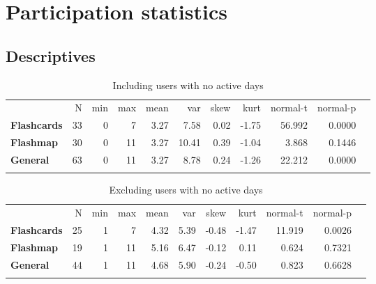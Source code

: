 \chapter{Participation statistics}
\label{app:dropouts}

\section{Descriptives}

\begin{longtable}[c]{@{}lrrrrrrrrrr@{}}
    \caption{Including users with no active days}
\endfirsthead
\toprule\addlinespace
& N & min & max & mean & var & skew & kurt & normal-t & normal-p
\\\addlinespace
\midrule
\textbf{Flashcards} & 33 & 0 & 7 & 3.27 & 7.58 & 0.02 & -1.75 & 56.992 &
0.0000
\\\addlinespace
\textbf{Flashmap} & 30 & 0 & 11 & 3.27 & 10.41 & 0.39 & -1.04 & 3.868 &
0.1446
\\\addlinespace
\textbf{General} & 63 & 0 & 11 & 3.27 & 8.78 & 0.24 & -1.26 & 22.212 &
0.0000
\\\addlinespace
\bottomrule
    \label{tab:dropouts_incl}
\end{longtable}

\begin{longtable}[c]{@{}lrrrrrrrrrr@{}}
    \caption{Excluding users with no active days}
\endfirsthead
\toprule\addlinespace
& N & min & max & mean & var & skew & kurt & normal-t & normal-p
\\\addlinespace
\midrule
\textbf{Flashcards} & 25 & 1 & 7 & 4.32 & 5.39 & -0.48 & -1.47 & 11.919
& 0.0026
\\\addlinespace
\textbf{Flashmap} & 19 & 1 & 11 & 5.16 & 6.47 & -0.12 & 0.11 & 0.624 &
0.7321
\\\addlinespace
\textbf{General} & 44 & 1 & 11 & 4.68 & 5.90 & -0.24 & -0.50 & 0.823 &
0.6628
\\\addlinespace
\bottomrule
    \label{tab:dropouts_excl}
\end{longtable}

